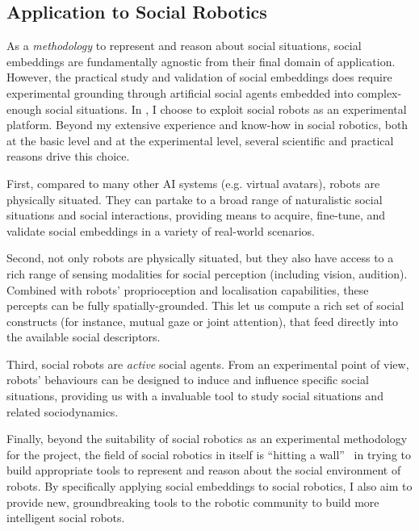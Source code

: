 \subsection{Application to Social Robotics}


As a \emph{methodology} to represent and reason about social situations, social
embeddings are fundamentally agnostic from their final domain of application.
However, the practical study and validation of social embeddings does require
experimental grounding through artificial social agents embedded into
complex-enough social situations. In \project, I choose to exploit social robots
as an experimental platform.  Beyond my extensive experience and know-how in
social robotics, both at the basic level and at the experimental level, several
scientific and practical reasons drive this choice.

First, compared to many other AI systems (e.g. virtual avatars), robots
are physically situated.  They can partake to a broad range of naturalistic
social situations and social interactions, providing means to acquire,
fine-tune, and validate social embeddings in a variety of real-world scenarios.

Second, not only robots are physically situated, but they also have access to a rich
range of sensing modalities for social perception (including vision, audition).
Combined with robots' proprioception and localisation capabilities, these
percepts can be fully spatially-grounded. This let us compute a rich set of
social constructs (for instance, mutual gaze or joint attention), that feed
directly into the available social descriptors.

Third, social robots are \emph{active} social agents. From an experimental point
of view, robots' behaviours can be
designed to induce and influence specific social situations, providing us with a
invaluable tool to study social situations and related sociodynamics.

Finally, beyond the suitability of social robotics as an experimental
methodology for the \project project, the field of social robotics in itself is
``hitting a wall''~\cite{yang2018grand} in trying to build appropriate tools to represent and
reason about the social environment of robots. By specifically applying social
embeddings to social robotics, I also aim to provide new, groundbreaking
tools to the robotic community to build more intelligent social robots.

